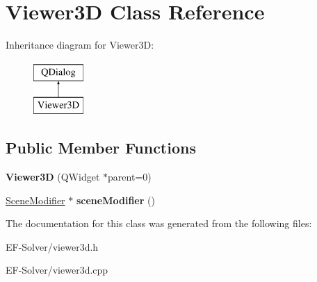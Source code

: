 \hypertarget{class_viewer3_d}{}\section{Viewer3D Class Reference}
\label{class_viewer3_d}
Inheritance diagram for Viewer3D\+:\begin{figure}[H]
\begin{center}
\leavevmode
\includegraphics[height=2.000000cm]{class_viewer3_d}
\end{center}
\end{figure}
\subsection*{Public Member Functions}
\begin{DoxyCompactItemize}
\item 
{\bfseries Viewer3D} (Q\+Widget $\ast$parent=0)\hypertarget{class_viewer3_d_ae5635482d377cfd4f271803434de0dcf}{}\label{class_viewer3_d_ae5635482d377cfd4f271803434de0dcf}

\item 
\hyperlink{class_scene_modifier}{Scene\+Modifier} $\ast$ {\bfseries scene\+Modifier} ()\hypertarget{class_viewer3_d_af592d359d5e9b7b3f2f0c3ac005d1190}{}\label{class_viewer3_d_af592d359d5e9b7b3f2f0c3ac005d1190}

\end{DoxyCompactItemize}


The documentation for this class was generated from the following files\+:\begin{DoxyCompactItemize}
\item 
E\+F-\/\+Solver/viewer3d.\+h\item 
E\+F-\/\+Solver/viewer3d.\+cpp\end{DoxyCompactItemize}

